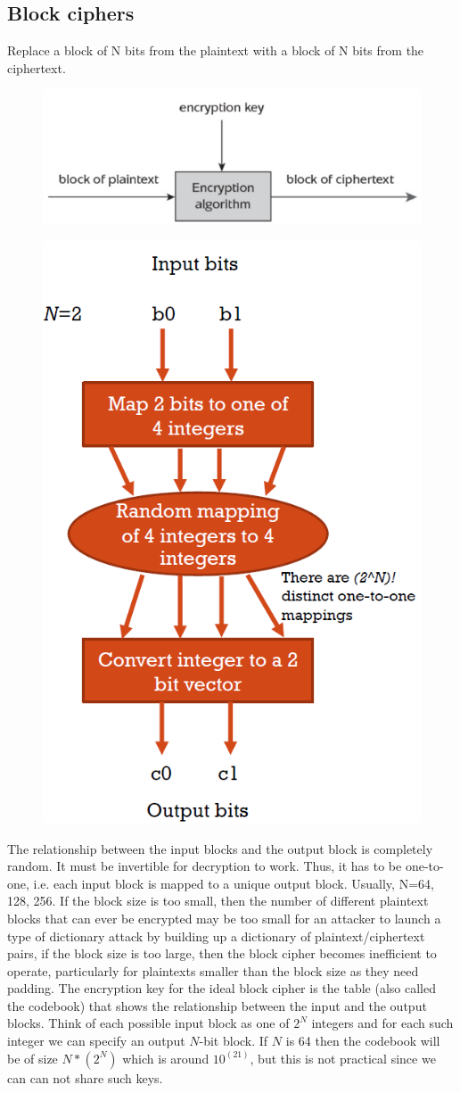 \subsection{Block ciphers}

Replace a block of N bits from the plaintext with a block of N bits from the ciphertext. 
\begin{figure}
	\centering
	\includegraphics[width=0.7\linewidth]{Images/Chapter2/screenshot001}
	\caption{}
	\label{fig:chapter2_screenshot001}
\end{figure}

\begin{figure}
	\centering
	\includegraphics[width=0.4\linewidth]{Images/Chapter2/screenshot002}
	\caption{}
	\label{fig:chapter2_screenshot002}
\end{figure}

The relationship between the input blocks and the output block is completely random. It must be invertible for decryption to work. Thus, it has to be one-to-one, i.e. each input block is mapped to a unique output block. Usually, N=64, 128, 256. If the block size is too small, then the number of different plaintext blocks that can ever be encrypted may be too small for an attacker to launch a type of dictionary attack by building up a dictionary of plaintext/ciphertext pairs, if the block size is too large, then the block cipher becomes inefficient to operate, particularly for plaintexts smaller than the block size as they need padding. The encryption key for the ideal block cipher is the table (also called the codebook) that shows the relationship between the input and the output blocks. Think of each possible input block as one of $2^N$ integers and for each such integer we can specify an output $N$-bit block. If $N$ is 64 then the codebook will be of size $N*(2^N)$ which is around $10^(21)$, but this is not practical since we can can not share such keys.

